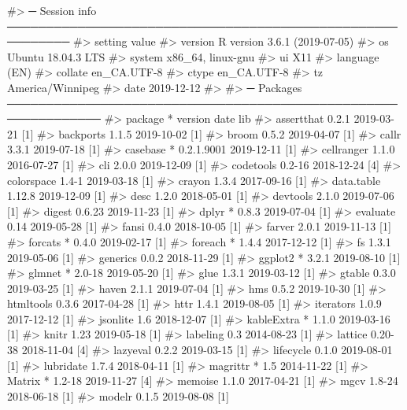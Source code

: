 \documentclass[
]{jss}
\begin{document}
\begin{CodeChunk}
\begin{CodeOutput}
#> ─ Session info ──────────────────────────────────────────────────────────
#>  setting  value                       
#>  version  R version 3.6.1 (2019-07-05)
#>  os       Ubuntu 18.04.3 LTS          
#>  system   x86_64, linux-gnu           
#>  ui       X11                         
#>  language (EN)                        
#>  collate  en_CA.UTF-8                 
#>  ctype    en_CA.UTF-8                 
#>  tz       America/Winnipeg            
#>  date     2019-12-12                  
#> 
#> ─ Packages ──────────────────────────────────────────────────────────────
#>  package     * version    date       lib
#>  assertthat    0.2.1      2019-03-21 [1]
#>  backports     1.1.5      2019-10-02 [1]
#>  broom         0.5.2      2019-04-07 [1]
#>  callr         3.3.1      2019-07-18 [1]
#>  casebase    * 0.2.1.9001 2019-12-11 [1]
#>  cellranger    1.1.0      2016-07-27 [1]
#>  cli           2.0.0      2019-12-09 [1]
#>  codetools     0.2-16     2018-12-24 [4]
#>  colorspace    1.4-1      2019-03-18 [1]
#>  crayon        1.3.4      2017-09-16 [1]
#>  data.table    1.12.8     2019-12-09 [1]
#>  desc          1.2.0      2018-05-01 [1]
#>  devtools      2.1.0      2019-07-06 [1]
#>  digest        0.6.23     2019-11-23 [1]
#>  dplyr       * 0.8.3      2019-07-04 [1]
#>  evaluate      0.14       2019-05-28 [1]
#>  fansi         0.4.0      2018-10-05 [1]
#>  farver        2.0.1      2019-11-13 [1]
#>  forcats     * 0.4.0      2019-02-17 [1]
#>  foreach     * 1.4.4      2017-12-12 [1]
#>  fs            1.3.1      2019-05-06 [1]
#>  generics      0.0.2      2018-11-29 [1]
#>  ggplot2     * 3.2.1      2019-08-10 [1]
#>  glmnet      * 2.0-18     2019-05-20 [1]
#>  glue          1.3.1      2019-03-12 [1]
#>  gtable        0.3.0      2019-03-25 [1]
#>  haven         2.1.1      2019-07-04 [1]
#>  hms           0.5.2      2019-10-30 [1]
#>  htmltools     0.3.6      2017-04-28 [1]
#>  httr          1.4.1      2019-08-05 [1]
#>  iterators     1.0.9      2017-12-12 [1]
#>  jsonlite      1.6        2018-12-07 [1]
#>  kableExtra  * 1.1.0      2019-03-16 [1]
#>  knitr         1.23       2019-05-18 [1]
#>  labeling      0.3        2014-08-23 [1]
#>  lattice       0.20-38    2018-11-04 [4]
#>  lazyeval      0.2.2      2019-03-15 [1]
#>  lifecycle     0.1.0      2019-08-01 [1]
#>  lubridate     1.7.4      2018-04-11 [1]
#>  magrittr    * 1.5        2014-11-22 [1]
#>  Matrix      * 1.2-18     2019-11-27 [4]
#>  memoise       1.1.0      2017-04-21 [1]
#>  mgcv          1.8-24     2018-06-18 [1]
#>  modelr        0.1.5      2019-08-08 [1]

\end{CodeOutput}
\end{CodeChunk}
\end{document}
